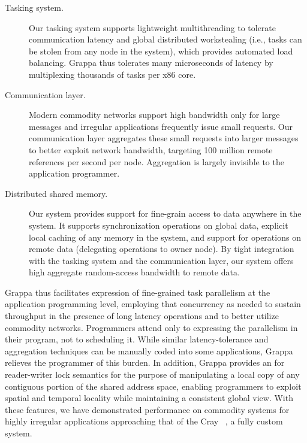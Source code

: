 \begin{description}

\item [Tasking system.] Our tasking system supports lightweight
multithreading to tolerate communication latency and global distributed
workstealing (i.e., tasks can be stolen from any node in the system), which
provides automated load balancing.  Grappa thus tolerates many
microseconds of latency by multiplexing thousands of tasks per x86 core.

\item[Communication layer.] Modern commodity networks
support high bandwidth only for large messages and irregular applications
frequently issue small requests.   Our communication layer aggregates these small requests into larger messages to better exploit network bandwidth, targeting 100 million remote references per second per node.  Aggregation is largely invisible to the application programmer.

\item[Distributed shared memory.] Our  system provides support for
fine-grain access to data anywhere in the system. It supports synchronization
operations on global data, explicit local caching of any memory in the system,
and support for operations on remote data (delegating operations to owner node).
By tight integration with the tasking system and the
communication layer, our  system offers high aggregate random-access bandwidth to remote data.


\end{description}
Grappa thus facilitates
expression of fine-grained task parallelism at the application
programming level, employing that concurrency as needed to sustain throughput in the presence of long latency operations and to better utilize commodity networks.  Programmers attend only to expressing the parallelism in their program, not to scheduling it.  While similar latency-tolerance and aggregation techniques can be manually coded into some
applications, Grappa relieves the programmer of this burden.  In
addition, Grappa provides an  for reader-writer lock semantics for the
purpose of manipulating a local copy of any contiguous portion of the
shared address space, enabling programmers to exploit spatial and
temporal locality while maintaining a consistent global view.  With
these features, we have demonstrated performance on commodity systems
for highly irregular applications approaching that of the Cray ~\cite{feo:xmt}, a
fully custom system.

